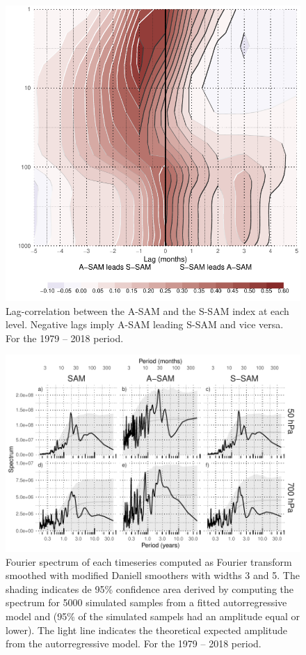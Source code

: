 \documentclass[smallextended]{svjour3}       %
\begin{document}
\begin{figure}[ht]
\includegraphics{A1-1} \caption{Lag-correlation between the A\nobreakdash-SAM and the S\nobreakdash-SAM index at each level. Negative lags imply A\nobreakdash-SAM leading S\nobreakdash-SAM and vice versa. For the 1979 -- 2018 period.}\label{fig:A1}
\end{figure}

\begin{figure}
\includegraphics{A2-1} \caption{Fourier spectrum of each timeseries computed as Fourier transform smoothed with modified Daniell smoothers with widths 3 and 5. The shading indicates de 95\% confidence area derived by computing the spectrum for 5000 simulated samples from a fitted autorregressive model and (95\% of the simulated sampels had an amplitude equal or lower). The light line indicates the theoretical expected amplitude from the autorregressive model. For the 1979 -- 2018 period.}\label{fig:A2}
\end{figure}

\newpage



\end{document}
